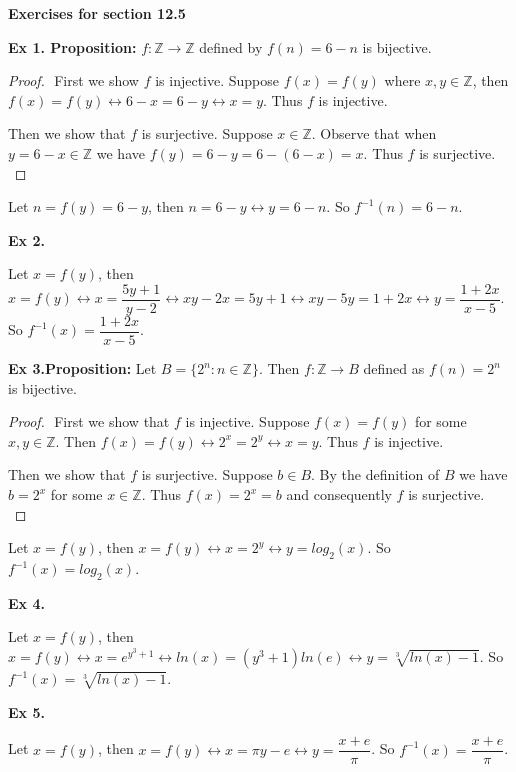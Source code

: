 \documentclass{article}
\date{}
\author{}
\begin{document}
\centerline{\textbf{Exercises for section 12.5}}

\textbf{Ex 1. Proposition:} $f : \mathbb{Z} \rightarrow \mathbb{Z}$ defined by $f(n)=6-n$ is bijective.
\begin{proof}
$ $\newline
First we show $f$ is injective. Suppose $f(x)=f(y)$ where $x, y \in \mathbb{Z}$, then $f(x)=f(y) \leftrightarrow 6-x=6-y \leftrightarrow x=y$. Thus $f$ is injective.

Then we show that $f$ is surjective. Suppose $x \in \mathbb{Z}$. Observe that when $y=6-x \in \mathbb{Z}$ we have $f(y)=6-y=6-(6-x)=x$. Thus $f$ is surjective.\\
\end{proof}

Let $n=f(y)=6-y$, then $n = 6-y \leftrightarrow y=6-n$. So $f^{-1}(n)=6-n$.

\textbf{Ex 2.}

Let $x=f(y)$, then $x=f(y) \leftrightarrow x = \dfrac{5y+1}{y-2} \leftrightarrow xy-2x=5y+1 \leftrightarrow xy-5y=1+2x \leftrightarrow y=\dfrac{1+2x}{x-5}$. So $f^{-1}(x)=\dfrac{1+2x}{x-5}$.

\textbf{Ex 3.Proposition:} Let $B = \{2^n: n \in \mathbb{Z}\}$. Then $f: \mathbb{Z} \rightarrow B$ defined as $f(n)=2^n$ is bijective.
\begin{proof}
$ $\newline
First we show that $f$ is injective. Suppose $f(x)=f(y)$ for some $x, y \in \mathbb{Z}$. Then $f(x)=f(y) \leftrightarrow 2^x=2^y \leftrightarrow x = y$. Thus $f$ is injective.

Then we show that $f$ is surjective. Suppose $b \in B$. By the definition of $B$ we have $b=2^x$ for some $x \in \mathbb{Z}$. Thus $f(x)=2^x=b$ and consequently $f$ is surjective.\\
\end{proof}

Let $x = f(y)$, then $x=f(y) \leftrightarrow x = 2^y \leftrightarrow y=log_2(x)$. So $f^{-1}(x)=log_2(x)$.

\textbf{Ex 4.}

Let $x=f(y)$, then $x=f(y) \leftrightarrow x = e^{y^3+1} \leftrightarrow ln(x) = (y^3+1)ln(e) \leftrightarrow y = \sqrt[3]{ln(x)-1}$. So $f^{-1}(x)=\sqrt[3]{ln(x)-1}$.

\textbf{Ex 5.}

Let $x=f(y)$, then $x=f(y) \leftrightarrow x = \pi y - e \leftrightarrow y=\dfrac{x+e}{\pi}$. So $f^{-1}(x)=\dfrac{x+e}{\pi}$.
\end{document}
